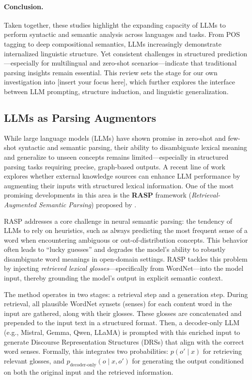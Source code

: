 \paragraph{Conclusion.}
Taken together, these studies highlight the expanding capacity of LLMs to perform syntactic and semantic analysis across languages and tasks. From POS tagging to deep compositional semantics, LLMs increasingly demonstrate internalized linguistic structure. Yet consistent challenges in structured prediction—especially for multilingual and zero-shot scenarios—indicate that traditional parsing insights remain essential. This review sets the stage for our own investigation into [insert your focus here], which further explores the interface between LLM prompting, structure induction, and linguistic generalization.

\subsection{LLMs as Parsing Augmentors}

While large language models (LLMs) have shown promise in zero-shot and few-shot syntactic and semantic parsing, their ability to disambiguate lexical meaning and generalize to unseen concepts remains limited—especially in structured parsing tasks requiring precise, graph-based outputs. A recent line of work explores whether external knowledge sources can enhance LLM performance by augmenting their inputs with structured lexical information. One of the most promising developments in this area is the \textbf{RASP} framework (\textit{Retrieval-Augmented Semantic Parsing}) proposed by \citet{zhang2024rasp}.

RASP addresses a core challenge in neural semantic parsing: the tendency of LLMs to rely on heuristics, such as always predicting the most frequent sense of a word when encountering ambiguous or out-of-distribution concepts. This behavior often leads to ``lucky guesses'' and degrades the model's ability to robustly disambiguate word meanings in open-domain settings. RASP tackles this problem by injecting \textit{retrieved lexical glosses}—specifically from WordNet—into the model input, thereby grounding the model’s output in explicit semantic context.

The method operates in two stages: a retrieval step and a generation step. During retrieval, all plausible WordNet synsets (senses) for each content word in the input are gathered, along with their glosses. These glosses are concatenated and prepended to the input text in a structured format. Then, a decoder-only LLM (e.g., Mistral, Gemma, Qwen, LLaMA) is prompted with this enriched input to generate Discourse Representation Structures (DRSs) that align with the correct word senses. Formally, this integrates two probabilities: \( p(o' \mid x) \) for retrieving relevant glosses, and \( p_{\text{decoder-only}}(o \mid x, o') \) for generating the output conditioned on both the original input and the retrieved information.

